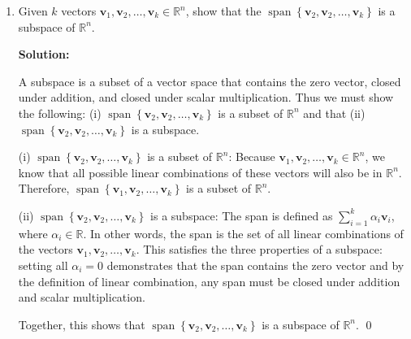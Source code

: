 \begin{enumerate}[label=(\alph*)]
	\item Given $k$ vectors $\mathbf{v}_1, \mathbf{v}_2, \ldots,
		      \mathbf{v}_{k} \in \mathbb{R}^n$, show that the
	      $\operatorname{span}\left\{\mathbf{v}_{2},
		      \mathbf{v}_{2}, \ldots, \mathbf{v}_{k}\right\}$ is a
	      subspace of $\mathbb{R}^n$.

	      \par \textbf{Solution:}
	      \par A subspace is a subset of a vector space that contains the zero
	      vector, closed under addition, and closed under scalar multiplication.
	      Thus we must show the following: (i) $\operatorname{span}\left\{\mathbf{v}_{2},
		      \mathbf{v}_{2}, \ldots, \mathbf{v}_{k}\right\}$ is a subset of
	      $\mathbb{R}^n$ and that (ii) $\operatorname{span}\left\{\mathbf{v}_{2},
		      \mathbf{v}_{2}, \ldots, \mathbf{v}_{k}\right\}$ is a subspace.

	      \par (i) $\operatorname{span}\left\{\mathbf{v}_{2},
		      \mathbf{v}_{2}, \ldots, \mathbf{v}_{k}\right\}$ is a subset of
	      $\mathbb{R}^n$: Because $\mathbf{v}_1, \mathbf{v}_2, \ldots,
		      \mathbf{v}_{k} \in \mathbb{R}^n$, we know that all possible linear
	      combinations of these vectors will also be in $\mathbb{R}^n$.
	      Therefore, $\operatorname{span}\left\{\mathbf{v}_{1},
		      \mathbf{v}_{2}, \ldots, \mathbf{v}_{k}\right\}$ is a subset of
	      $\mathbb{R}^n$.

	      \par (ii) $\operatorname{span}\left\{\mathbf{v}_{2},
		      \mathbf{v}_{2}, \ldots, \mathbf{v}_{k}\right\}$ is a subspace:
	      The span is defined as $\sum_{i=1}^{k} \alpha_i \mathbf{v}_i$,
	      where $\alpha_i \in \mathbb{R}$. In other words, the span is the set
	      of all linear combinations of the vectors $\mathbf{v}_1, \mathbf{v}_2,
		      \ldots, \mathbf{v}_{k}$. This satisfies the three properties of a
	      subspace: setting all $\alpha_i = 0$ demonstrates that the span
	      contains the zero vector and by the definition of linear combination,
	      any span must be closed under addition and scalar multiplication.

	      \par Together, this shows that $\operatorname{span}\left\{\mathbf{v}_{2},
		      \mathbf{v}_{2}, \ldots, \mathbf{v}_{k}\right\}$ is a subspace of
	      $\mathbb{R}^n$. \qed


\end{enumerate}
